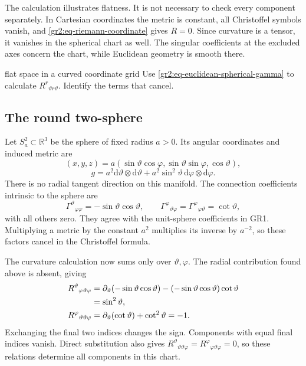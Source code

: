 \documentclass[11pt,a4paper]{article}
\numberwithin{equation}{section}
\newcommand{\R}{\mathbb R}
\newcommand{\dd}{\mathrm d}
\newcommand{\slideref}[1]{\par\nobreak\smallskip\nobreak{\footnotesize\color{ink!60}\textsc{Source slide #1}}\par\nobreak\smallskip\nobreak}
\begin{document}
The calculation illustrates flatness. It is not necessary to check every
component separately. In Cartesian coordinates the metric is constant,
all Christoffel symbols vanish, and
\eqref{gr2:eq-riemann-coordinate} gives \(R=0\). Since curvature is a
tensor, it vanishes in the spherical chart as well. The singular
coefficients at the excluded axes concern the chart, while Euclidean
geometry is smooth there.

\begin{studentwork}[2.7cm]{flat space in a curved coordinate grid}
Use \eqref{gr2:eq-euclidean-spherical-gamma} to calculate
\(R^r{}_{\vartheta r\vartheta}\). Identify the terms that cancel.
\end{studentwork}

\subsection{The round two-sphere}
\slideref{12}

Let \(S^2_a\subset\R^3\) be the sphere of fixed radius \(a>0\). Its
angular coordinates and induced metric are
\[
 (x,y,z)=a(\sin\vartheta\cos\varphi,
          \sin\vartheta\sin\varphi,\cos\vartheta),
\]
\begin{equation}
 g=a^2\dd\vartheta\otimes\dd\vartheta
   +a^2\sin^2\vartheta\,\dd\varphi\otimes\dd\varphi.
 \label{gr2:eq-round-sphere-metric}
\end{equation}
There is no radial tangent direction on this manifold. The connection
coefficients intrinsic to the sphere are
\begin{equation}
 \Gamma^\vartheta{}_{\varphi\varphi}=-\sin\vartheta\cos\vartheta,
 \qquad
 \Gamma^\varphi{}_{\vartheta\varphi}
 =\Gamma^\varphi{}_{\varphi\vartheta}=\cot\vartheta,
 \label{gr2:eq-round-sphere-gamma}
\end{equation}
with all others zero. They agree with the unit-sphere coefficients in
GR1. Multiplying a metric by the constant \(a^2\) multiplies its inverse
by \(a^{-2}\), so these factors cancel in the Christoffel formula.

The curvature calculation now sums only over \(\vartheta,\varphi\).
The radial contribution found above is absent, giving
\begin{align}
 R^\vartheta{}_{\varphi\vartheta\varphi}
 &=\partial_\vartheta(-\sin\vartheta\cos\vartheta)
   -(-\sin\vartheta\cos\vartheta)\cot\vartheta\notag\\
 &=\sin^2\vartheta,
 \label{gr2:eq-sphere-riemann-one}\\
 R^\varphi{}_{\vartheta\vartheta\varphi}
 &=\partial_\vartheta(\cot\vartheta)+\cot^2\vartheta=-1.
 \label{gr2:eq-sphere-riemann-two}
\end{align}
Exchanging the final two indices changes the sign. Components with equal
final indices vanish. Direct substitution also gives
\(R^\vartheta{}_{\vartheta\vartheta\varphi}
=R^\varphi{}_{\varphi\vartheta\varphi}=0\), so these relations determine
all components in this chart.
\end{document}
